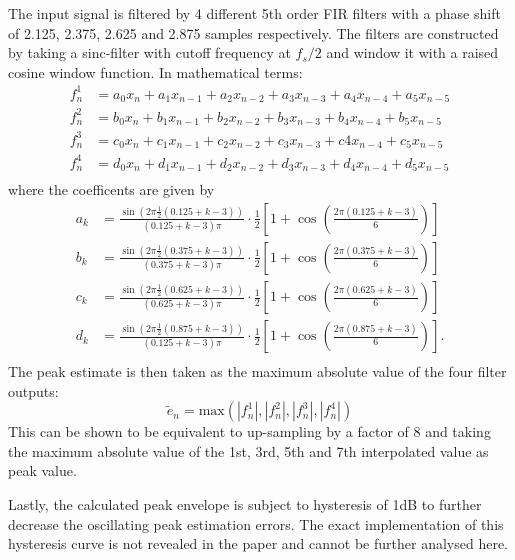 \documentclass[../main2.tex]{subfiles}
\begin{document}
The input signal is filtered by 4 different 5th order FIR filters with a phase shift of 2.125, 2.375, 2.625 and 2.875 samples respectively. The filters are constructed by taking a sinc-filter with cutoff frequency at $f_s/2$ and window it with a raised cosine window function. In mathematical terms:
\begin{equation}
\begin{split}
f^1_n &= a_0 x_{n} + a_1 x_{n-1} + a_2 x_{n-2} + a_3 x_{n-3} + a_4 x_{n-4} + a_5 x_{n-5} \\
f^2_n &= b_0 x_{n} + b_1 x_{n-1} + b_2 x_{n-2} + b_3 x_{n-3} + b_4 x_{n-4} + b_5 x_{n-5} \\
f^3_n &= c_0 x_{n} + c_1 x_{n-1} + c_2 x_{n-2} + c_3 x_{n-3} + c4 x_{n-4} + c_5 x_{n-5} \\
f^4_n &= d_0 x_{n} + d_1 x_{n-1} + d_2 x_{n-2} + d_3 x_{n-3} + d_4 x_{n-4} + d_5 x_{n-5} \\
\end{split}
\end{equation}
where the coefficents are given by
\begin{equation}
\begin{split}
a_k &= \frac{\sin (2 \pi \frac{1}{2} (0.125+k-3) )}{(0.125+k-3)\pi} \cdot \frac{1}{2}\left[1+\cos \left(\frac{2 \pi (0.125+k-3)}{6} \right) \right] \\
b_k &= \frac{\sin (2 \pi \frac{1}{2} (0.375+k-3) )}{(0.375+k-3)\pi} \cdot \frac{1}{2}\left[1+\cos \left(\frac{2 \pi (0.375+k-3)}{6} \right) \right] \\
c_k &= \frac{\sin (2 \pi \frac{1}{2} (0.625+k-3) )}{(0.625+k-3)\pi} \cdot \frac{1}{2}\left[1+\cos \left(\frac{2 \pi (0.625+k-3)}{6} \right) \right] \\
d_k &= \frac{\sin (2 \pi \frac{1}{2} (0.875+k-3) )}{(0.125+k-3)\pi} \cdot \frac{1}{2}\left[1+\cos \left(\frac{2 \pi (0.875+k-3)}{6} \right) \right]. \\
\end{split}
\end{equation}
The peak estimate is then taken as the maximum absolute value of the four filter outputs:
\begin{equation}
\tilde{e}_n = \text{max}(|f^1_n|, |f^2_n|, |f^3_n|, |f^4_n|)
\end{equation}
This can be shown to be equivalent to up-sampling by a factor of 8 and taking the maximum absolute value of the 1st, 3rd, 5th and 7th interpolated value as peak value. 

Lastly, the calculated peak envelope is subject to hysteresis of 1dB to further decrease the oscillating peak estimation errors. The exact implementation of this hysteresis curve is not revealed in the paper and cannot be further analysed here.
\end{document}
